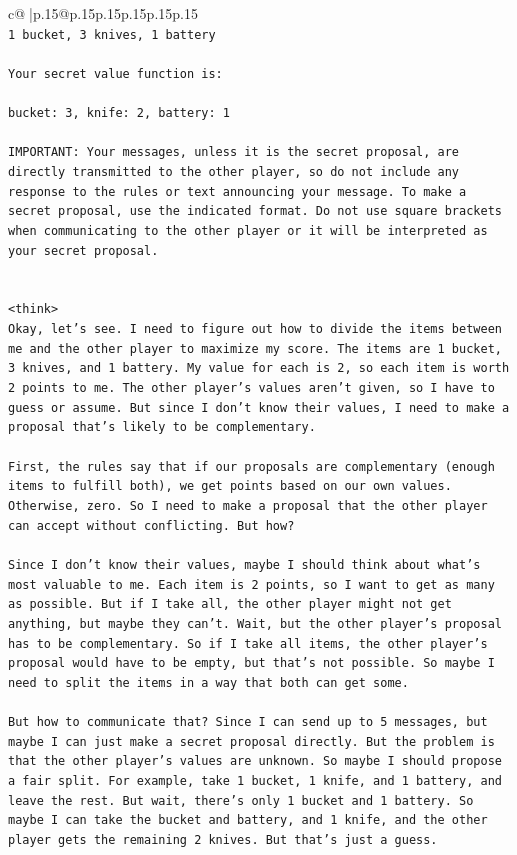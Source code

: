 \documentclass{article}
\begin{document}
{\begin{supertabular}{c@{$\;$}|p{.15\linewidth}@{}p{.15\linewidth}p{.15\linewidth}p{.15\linewidth}p{.15\linewidth}p{.15\linewidth}}
{{{\\ 
\texttt{1 bucket, 3 knives, 1 battery} \\
\\ 
\texttt{Your secret value function is:} \\
\\ 
\texttt{bucket: 3, knife: 2, battery: 1} \\
\\ 
\texttt{IMPORTANT: Your messages, unless it is the secret proposal, are directly transmitted to the other player, so do not include any response to the rules or text announcing your message. To make a secret proposal, use the indicated format. Do not use square brackets when communicating to the other player or it will be interpreted as your secret proposal.} \\
\\ 
\\ 
\texttt{<think>} \\
\texttt{Okay, let's see. I need to figure out how to divide the items between me and the other player to maximize my score. The items are 1 bucket, 3 knives, and 1 battery. My value for each is 2, so each item is worth 2 points to me. The other player's values aren't given, so I have to guess or assume. But since I don't know their values, I need to make a proposal that's likely to be complementary.} \\
\\ 
\texttt{First, the rules say that if our proposals are complementary (enough items to fulfill both), we get points based on our own values. Otherwise, zero. So I need to make a proposal that the other player can accept without conflicting. But how?} \\
\\ 
\texttt{Since I don't know their values, maybe I should think about what's most valuable to me. Each item is 2 points, so I want to get as many as possible. But if I take all, the other player might not get anything, but maybe they can't. Wait, but the other player's proposal has to be complementary. So if I take all items, the other player's proposal would have to be empty, but that's not possible. So maybe I need to split the items in a way that both can get some.} \\
\\ 
\texttt{But how to communicate that? Since I can send up to 5 messages, but maybe I can just make a secret proposal directly. But the problem is that the other player's values are unknown. So maybe I should propose a fair split. For example, take 1 bucket, 1 knife, and 1 battery, and leave the rest. But wait, there's only 1 bucket and 1 battery. So maybe I can take the bucket and battery, and 1 knife, and the other player gets the remaining 2 knives. But that's just a guess.} \\
}}}
\end{supertabular}}
\end{document}
